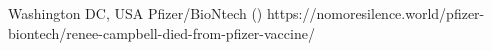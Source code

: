           {Washington DC, USA}
          {}
          {Pfizer/BioNtech}
          {}
          {
             ()
          }
          {https://nomoresilence.world/pfizer-biontech/renee-campbell-died-from-pfizer-vaccine/}



